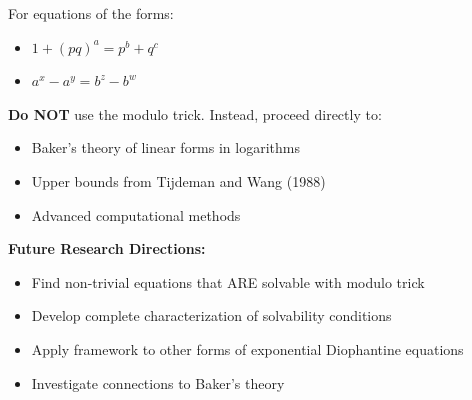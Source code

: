 \documentclass[12pt]{article}
\begin{document}
\begin{tcbposter}[
poster = {showframe=false,columns=3,rows=6,spacing=7mm,height=84cm},
]
{\begin{tcolorbox}[colback=green!15, colframe=green!60!black]
For equations of the forms:
\begin{itemize}
    \itemsep0.05cm
    \item $1+(pq)^a = p^b + q^c$
    \item $a^x - a^y = b^z - b^w$
\end{itemize}

\textbf{Do NOT} use the modulo trick. Instead, proceed directly to:
\begin{itemize}
    \itemsep0.05cm
    \item Baker's theory of linear forms in logarithms
    \item Upper bounds from Tijdeman and Wang (1988)
    \item Advanced computational methods
\end{itemize}
\end{tcolorbox}

\vspace{0.2cm}
\textbf{Future Research Directions:}
\begin{itemize}
    \itemsep0.05cm
    \item Find non-trivial equations that ARE solvable with modulo trick
    \item Develop complete characterization of solvability conditions
    \item Apply framework to other forms of exponential Diophantine equations
    \item Investigate connections to Baker's theory
\end{itemize}
}

\end{tcbposter}
\end{document}
